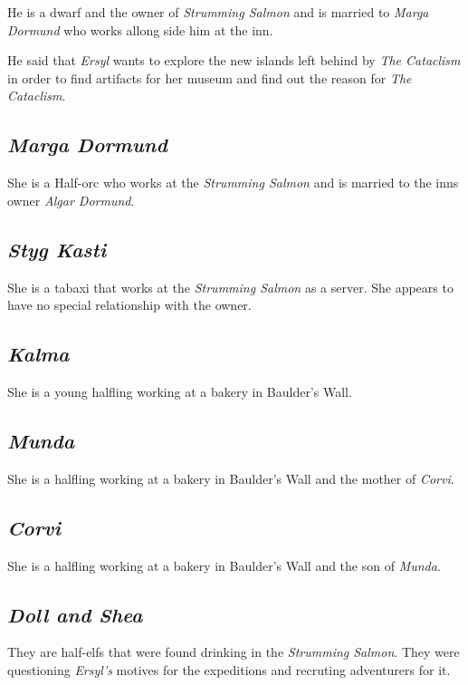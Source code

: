 \documentclass{article}
\begin{document}
\begin{multicols}{2}
    He is a dwarf and the owner of \textit{Strumming Salmon} and is married to \textit{Marga Dormund} who works allong side him at the inn.

    He said that \textit{Ersyl} wants to explore the new islands left behind by \textit{The Cataclism} in order to find artifacts for her museum and find out the reason for \textit{The Cataclism}.

    \subsection{\textit{Marga Dormund}}

    She is a Half-orc who works at the \textit{Strumming Salmon} and is married to the inns owner \textit{Algar Dormund}.

    \subsection{\textit{Styg Kasti}}

    She is a tabaxi that works at the \textit{Strumming Salmon} as a server. She appears to have no special relationship with the owner.

    \subsection{\textit{Kalma}}

    She is a young halfling working at a bakery in Baulder's Wall.

    \subsection{\textit{Munda}}

    She is a halfling working at a bakery in Baulder's Wall and the mother of \textit{Corvi}.

    \subsection{\textit{Corvi}}

    She is a halfling working at a bakery in Baulder's Wall and the son of \textit{Munda}.

    \subsection{\textit{Doll and Shea}}

    They are half-elfs that were found drinking in the \textit{Strumming Salmon}. They were questioning \textit{Ersyl's} motives for the expeditions and recruting adventurers for it.


\end{multicols}
\end{document}
